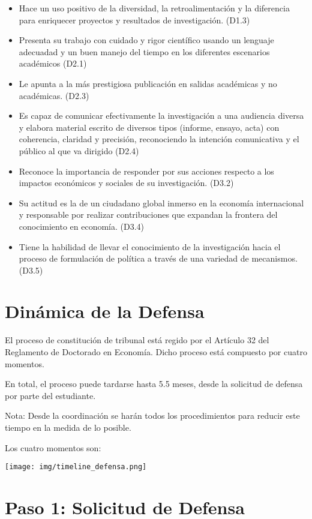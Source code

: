 \begin{itemize}
\item 	Hace un uso positivo de la diversidad, la retroalimentación y la diferencia para enriquecer proyectos y resultados de investigación. (D1.3)
\item 	Presenta su trabajo con cuidado y rigor científico usando un lenguaje adecuadad y un buen manejo del tiempo en los diferentes escenarios académicos (D2.1)
\item 	Le apunta a la más prestigiosa publicación en salidas académicas y no académicas. (D2.3)
\item 	Es capaz de comunicar efectivamente la investigación a una audiencia diversa y elabora material escrito de diversos tipos (informe, ensayo, acta) con coherencia, claridad y precisión, reconociendo la intención comunicativa y el público al que va dirigido (D2.4)
\item 	Reconoce la importancia de responder por sus acciones respecto a los impactos económicos y sociales de su investigación. (D3.2)
\item 	Su actitud es la de un ciudadano global inmerso en la economía internacional y responsable por realizar contribuciones que expandan la frontera del conocimiento en economía. (D3.4)
\item 	Tiene la habilidad de llevar el conocimiento de la investigación hacia el proceso de formulación de política a través de una variedad de mecanismos. (D3.5)
\end{itemize}




\section{Dinámica de la Defensa}

El proceso de constitución de tribunal está regido por el Artículo 32 del Reglamento de Doctorado en Economía. Dicho proceso está compuesto por cuatro momentos. 

En total, el proceso puede tardarse hasta 5.5 meses, desde la solicitud de defensa por parte del estudiante. 

Nota: Desde la coordinación se harán todos los procedimientos para reducir este tiempo en la medida de lo posible.

Los cuatro momentos son:

\texttt{[image: img/timeline\_defensa.png]}

\section{Paso 1: Solicitud de Defensa}

